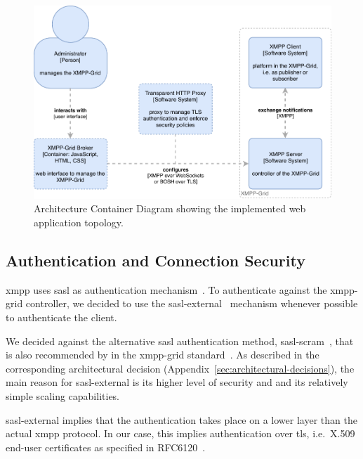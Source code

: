 \begin{figure}[H]
    \centering
    \includegraphics[width=\linewidth]{resources/architecture_container_webapplication_with_http_proxy}
    \caption[Architecture Container Diagram: Web Application with transparent Proxy]{Architecture Container Diagram showing the implemented web application topology.}
    \label{fig:architecturecontainerweb-http-proxy}
\end{figure}
  

\subsection{Authentication and Connection Security}\label{sec:authentication-and-connection-security}

\gls{xmpp} uses \gls{sasl} as authentication mechanism~\cite{rfc6120}.
To authenticate against the \gls{xmpp-grid} \gls{controller}, we decided to use the \gls{sasl-external}~\cite{rfc4422} mechanism whenever possible to authenticate the client.

We decided against the alternative \gls{sasl} authentication method, \gls{sasl-scram}~\cite{rfc7677}, that is also recommended by in the \gls{xmpp-grid} standard~\cite{ietf-mile-xmpp-grid-05}.
As described in the corresponding architectural decision (Appendix~\ref{sec:architectural-decisions}), the main reason for \gls{sasl-external} is its higher level of security and and its relatively simple scaling capabilities.

\gls{sasl-external} implies that the authentication takes place on a lower layer than the actual \gls{xmpp} protocol. In our case, this implies authentication over \gls{tls}, i.e.~X.509 end-user certificates as specified in RFC6120~\cite{rfc6120}.

